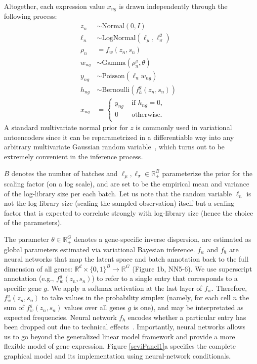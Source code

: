 Altogether, each expression value $x_{ng}$ is drawn independently through the following process:
\begin{align}
	z_n &\sim \textrm{Normal}(0, I) \\
    \ell_n &\sim \textrm{LogNormal}(\ell_\mu, \ell_\sigma^2) \\
    \rho_n &= f_w(z_n, s_n) \\
    w_{ng} &\sim \mathrm{Gamma}(\rho_n^g, \theta) \\
    y_{ng} &\sim \mathrm{Poisson}( \ell_n w_{ng}) \\
    h_{ng} &\sim \mathrm{Bernoulli}(f_h^g(z_n, s_n)) \\
    x_{ng} &=
\begin{cases}
y_{ng} & \text{ if } h_{ng} = 0,\\
0 & \text{ otherwise}.\\
\end{cases}
\end{align}
A standard multivariate normal prior for $z$ is commonly used in variational autoencoders since it can be reparametrized in a differentiable way into any arbitrary multivariate Gaussian random variable~\cite{kingma2013}, which turns out to be extremely convenient in the inference process. 

$B$ denotes the number of batches and $\ell_\mu, \ell_\sigma \in \mathbb{R}_+^B$ parameterize the prior for the scaling factor (on a log scale), and are set to be the empirical mean and variance of the log-library size per each batch. Let us note that the random variable $\ell_n$ is not the log-library size (scaling the sampled observation) itself but a scaling factor that is expected to correlate strongly with log-library size (hence the choice of the parameters).

The parameter $\theta \in \mathbb{R}_+^G$ denotes a gene-specific inverse dispersion, are estimated as global parameters estimated via variational Bayesian inference. $f_w$ and $f_h$ are neural networks that map the latent space and batch annotation back to the full dimension of all genes: $\mathbb{R}^d\times\{0, 1\}^B \rightarrow \mathbb{R}^G$ (Figure 1b, NN5-6). We use superscript annotation (e.g., $f_w^g(z_n, s_n)$) to refer to a single entry that corresponds to a specific gene $g$. We apply a softmax activation at the last layer of $f_w$. Therefore, $f_w^g(z_n, s_n)$ to take values in the probability simplex (namely, for each cell $n$ the sum of $f_w^g(z_n, s_n)$ values over all genes $g$ is one), and may be interpretated as expected frequencies. Neural network $f_h$ encodes whether a particular entry has been dropped out due to technical effects~\cite{zifa,zinbwave}. Importantly, neural networks allows us to go beyond the generalized linear model framework and provide a more flexible model of gene expression. Figure \ref{scviPanel1}a specifies the complete graphical model and its implementation using neural-network conditionals.

